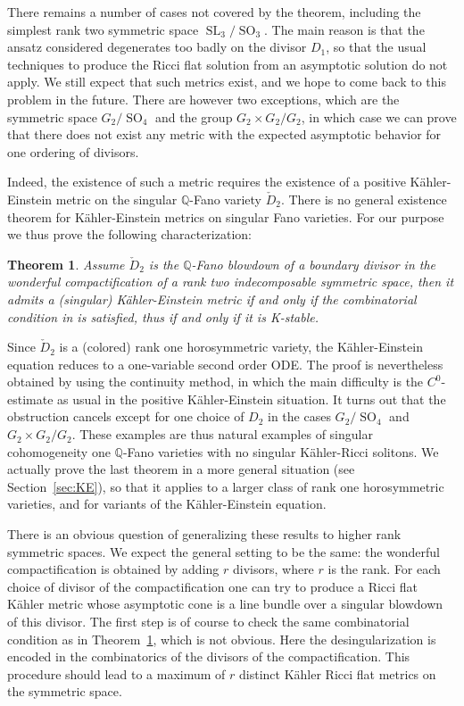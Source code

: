 \documentclass[JEP,XML,SOM,Unicode, NoEqCountersInSection, NoFloatCountersInSection]{cedram}
\theoremstyle{plain}
\newtheorem{thm}{Theorem}[section]
\theoremstyle{definition}
\DeclareMathOperator{\SL}{SL}
\DeclareMathOperator{\SO}{SO}
\begin{document}
There remains a number of cases not covered by the theorem, including the simplest
rank two symmetric space $\SL_3/\SO_3$. The main reason is that the ansatz considered
degenerates too badly on the divisor $D_1$, so that the usual techniques to produce
the Ricci flat solution from an asymptotic solution do not apply. We still expect
that such metrics exist, and we hope to come back to this problem in the future. There are however two exceptions, which are the symmetric
space $G_2/\SO_4$ and the group $G_2\times G_2/G_2$, in which case we can prove that
there does not exist any metric with the expected asymptotic behavior for one ordering
of divisors.

Indeed, the existence of such a metric requires the existence of a positive Kähler-Einstein
metric on the singular $\mathbb{Q}$-Fano variety $\check{D}_2$. There is no general existence
theorem for Kähler-Einstein metrics on singular Fano varieties.
For our purpose we thus prove the following characterization:

\begin{thm}\label{th:2}
Assume $\check{D}_2$ is the $\mathbb{Q}$-Fano blowdown of a boundary divisor in the
wonderful compactification of a rank two indecomposable symmetric space, then
it admits a (singular) Kähler-Einstein metric if and only if the combinatorial
condition in \cite{DelKSSV} is satisfied, thus if and only if it is K-stable.
\end{thm}

Since $\check{D}_2$ is a (colored) rank one horosymmetric variety,
the Kähler-Einstein equation reduces to a one-variable second order ODE.
The proof is nevertheless obtained by using the continuity method,
in which the main difficulty is the $C^0$-estimate as usual in the positive
Kähler-Einstein situation.
It turns out that the obstruction cancels except for one choice of $D_2$ in the
cases $G_2/\SO_4$ and $G_2\times G_2/G_2$. These examples are thus natural examples
of singular cohomogeneity one $\mathbb{Q}$-Fano varieties with no singular Kähler-Ricci
solitons.
We actually prove the last theorem in a more general situation (see Section~\ref{sec:KE}),
so that it applies to a larger class of rank one horosymmetric varieties,
and for variants of the Kähler-Einstein equation.

There is an obvious question of generalizing these results to higher rank symmetric spaces. We expect the general setting to be the same: the wonderful compactification is obtained by adding $r$ divisors, where $r$ is the rank. For each choice of divisor of the compactification one can try to produce a Ricci flat Kähler metric whose asymptotic cone is a line bundle over a singular blowdown of this divisor. The first step is of course to check the same combinatorial condition as in Theorem~\ref{th:2}, which is not obvious. Here the desingularization is encoded in the combinatorics of the divisors of the compactification. This procedure should lead to a maximum of $r$ distinct Kähler Ricci flat metrics on the symmetric space.
\end{document}
